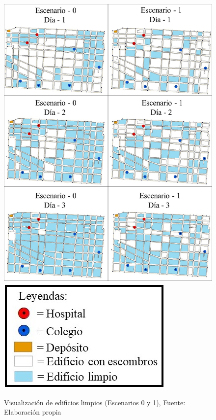 \documentclass[12pt,a4paper]{article}
\begin{document}
\begin{figure}[h!]
\centering
\includegraphics[scale=0.3]{Figuras/visu2.jpg} 
\includegraphics[scale=0.4]{Figuras/simb2.jpg}
\caption{Visualización de edificios limpios  (Escenarios 0 y 1), Fuente: Elaboración propia}
\label{fig:esc01-visu}
\end{figure}


\end{document}
